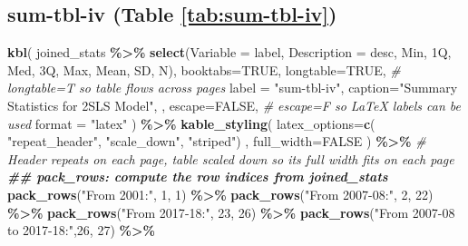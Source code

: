 \documentclass[
]{article}
\newenvironment{Shaded}{\begin{snugshade}}{\end{snugshade}}
\newcommand{\AttributeTok}[1]{\textcolor[rgb]{0.13,0.29,0.53}{#1}}
\newcommand{\CommentTok}[1]{\textcolor[rgb]{0.56,0.35,0.01}{\textit{#1}}}
\newcommand{\ConstantTok}[1]{\textcolor[rgb]{0.56,0.35,0.01}{#1}}
\newcommand{\DecValTok}[1]{\textcolor[rgb]{0.00,0.00,0.81}{#1}}
\newcommand{\DocumentationTok}[1]{\textcolor[rgb]{0.56,0.35,0.01}{\textbf{\textit{#1}}}}
\newcommand{\FunctionTok}[1]{\textcolor[rgb]{0.13,0.29,0.53}{\textbf{#1}}}
\newcommand{\NormalTok}[1]{#1}
\newcommand{\SpecialCharTok}[1]{\textcolor[rgb]{0.81,0.36,0.00}{\textbf{#1}}}
\newcommand{\StringTok}[1]{\textcolor[rgb]{0.31,0.60,0.02}{#1}}
\begin{document}
\subsection*{sum-tbl-iv (Table \ref{tab:sum-tbl-iv})}\label{sum-tbl-iv-table-reftabsum-tbl-iv}

\begin{Shaded}
\begin{Highlighting}[]
\FunctionTok{kbl}\NormalTok{(}
\NormalTok{  joined\_stats }\SpecialCharTok{\%\textgreater{}\%} 
      \FunctionTok{select}\NormalTok{(}\AttributeTok{Variable =}\NormalTok{ label, }\AttributeTok{Description =}\NormalTok{ desc, Min, }\StringTok{\textasciigrave{}}\AttributeTok{1Q}\StringTok{\textasciigrave{}}\NormalTok{, Med, }\StringTok{\textasciigrave{}}\AttributeTok{3Q}\StringTok{\textasciigrave{}}\NormalTok{, Max, Mean, SD, N),}
  \AttributeTok{booktabs=}\ConstantTok{TRUE}\NormalTok{, }
  \AttributeTok{longtable=}\ConstantTok{TRUE}\NormalTok{, }\CommentTok{\# longtable=T so table flows across pages}
  \AttributeTok{label =} \StringTok{"sum{-}tbl{-}iv"}\NormalTok{, }
  \AttributeTok{caption=}\StringTok{"Summary Statistics for 2SLS Model"}\NormalTok{,}
\NormalTok{, }
  \AttributeTok{escape=}\ConstantTok{FALSE}\NormalTok{, }\CommentTok{\# escape=F so LaTeX labels can be used}
  \AttributeTok{format =} \StringTok{"latex"}
\NormalTok{  ) }\SpecialCharTok{\%\textgreater{}\%}
  \FunctionTok{kable\_styling}\NormalTok{(}
    \AttributeTok{latex\_options=}\FunctionTok{c}\NormalTok{(}
      \StringTok{"repeat\_header"}\NormalTok{,}
      \StringTok{"scale\_down"}\NormalTok{,}
      \StringTok{"striped"}\NormalTok{)}
\NormalTok{    , }\AttributeTok{full\_width=}\ConstantTok{FALSE}
\NormalTok{    ) }\SpecialCharTok{\%\textgreater{}\%} \CommentTok{\# Header repeats on each page, table scaled down so its full width fits on each page}
  \DocumentationTok{\#\# pack\_rows: compute the row indices from joined\_stats}
  \FunctionTok{pack\_rows}\NormalTok{(}\StringTok{"From 2001:"}\NormalTok{,       }\DecValTok{1}\NormalTok{,   }\DecValTok{1}\NormalTok{) }\SpecialCharTok{\%\textgreater{}\%}
  \FunctionTok{pack\_rows}\NormalTok{(}\StringTok{"From 2007{-}08:"}\NormalTok{,    }\DecValTok{2}\NormalTok{,  }\DecValTok{22}\NormalTok{) }\SpecialCharTok{\%\textgreater{}\%}
  \FunctionTok{pack\_rows}\NormalTok{(}\StringTok{"From 2017{-}18:"}\NormalTok{,   }\DecValTok{23}\NormalTok{,  }\DecValTok{26}\NormalTok{) }\SpecialCharTok{\%\textgreater{}\%}
  \FunctionTok{pack\_rows}\NormalTok{(}\StringTok{"From 2007{-}08 to 2017{-}18:"}\NormalTok{,}\DecValTok{26}\NormalTok{,  }\DecValTok{27}\NormalTok{) }\SpecialCharTok{\%\textgreater{}\%}

\end{Highlighting}
\end{Shaded}
\end{document}
